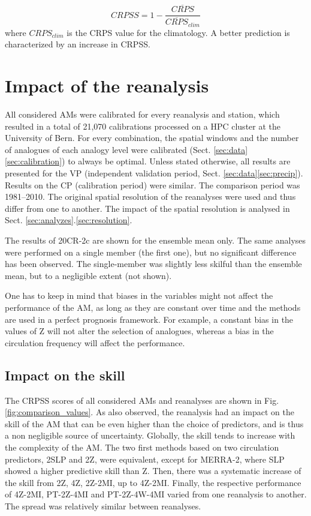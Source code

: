 \documentclass{ametsoc}
\begin{document}
\begin{equation}
\label{eq:CRPSS}
CRPSS = 1-\frac{\overline{CRPS}}{\overline{CRPS}_{clim}}
\end{equation}
where $CRPS_{clim}$ is the CRPS value for the climatology. A better prediction is characterized by an increase in CRPSS.


\section{Impact of the reanalysis}
\label{sec:influence}

All considered AMs were calibrated for every reanalysis and station, which resulted in a total of 21,070 calibrations processed on a HPC cluster at the University of Bern. For every combination, the spatial windows and the number of analogues of each analogy level were calibrated (Sect. \ref{sec:data}\ref{sec:calibration}) to always be optimal. Unless stated otherwise, all results are presented for the VP (independent validation period, Sect. \ref{sec:data}\ref{sec:precip}). Results on the CP (calibration period) were similar. The comparison period was 1981--2010. The original spatial resolution of the reanalyses were used and thus differ from one to another. The impact of the spatial resolution is analysed in Sect. \ref{sec:analyzes}.\ref{sec:resolution}.

The results of 20CR-2c are shown for the ensemble mean only. The same analyses were performed on a single member (the first one), but no significant difference has been observed. The single-member was slightly less skilful than the ensemble mean, but to a negligible extent (not shown).

One has to keep in mind that biases in the variables might not affect the performance of the AM, as long as they are constant over time and the methods are used in a perfect prognosis framework. For example, a constant bias in the values of Z will not alter the selection of analogues, whereas a bias in the circulation frequency will affect the performance.


\subsection{Impact on the skill}

The CRPSS scores of all considered AMs and reanalyses are shown in Fig. \ref{fig:comparison_values}. As \citet{Dayon2015} also observed, the reanalysis had an impact on the skill of the AM that can be even higher than the choice of predictors, and is thus a non negligible source of uncertainty. Globally, the skill tends to increase with the complexity of the AM. The two first methods based on two circulation predictors, 2SLP and 2Z, were equivalent, except for MERRA-2, where SLP showed a higher predictive skill than Z. Then, there was a systematic increase of the skill from 2Z, 4Z, 2Z-2MI, up to 4Z-2MI. Finally, the respective performance of 4Z-2MI, PT-2Z-4MI and PT-2Z-4W-4MI varied from one reanalysis to another. The spread was relatively similar between reanalyses.
\end{document}
